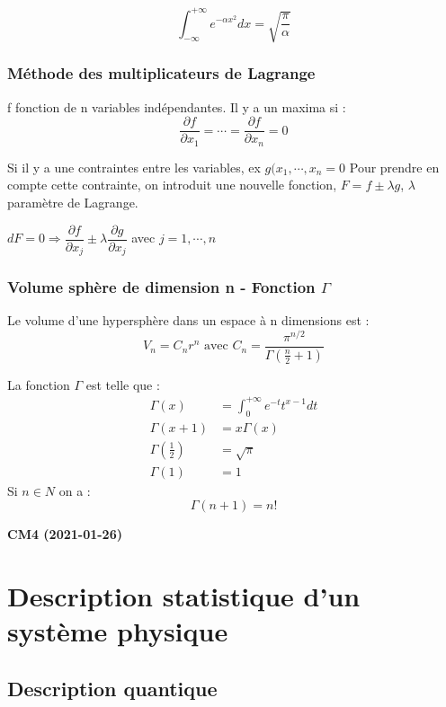 \documentclass[12pt,a4paper]{report}
\begin{document}
\[
	\int_{-\infty}^{+\infty} e^{-\alpha x^2}dx = \sqrt{\dfrac{\pi}{\alpha}}
\]

\subsection{Méthode des multiplicateurs de Lagrange}

f fonction de n variables indépendantes. Il y a un maxima si :
\[
	\dfrac{\partial f}{\partial x_1} = \cdots = \dfrac{\partial f}{\partial x_n} = 0
\]

Si il y a une contraintes entre les variables, ex \(g(x_1, \cdots, x_n = 0\)
Pour prendre en compte cette contrainte, on introduit une nouvelle fonction, \(F = f \pm \lambda g\), \(\lambda\) paramètre de Lagrange.

\(dF = 0 \Rightarrow \dfrac{\partial f}{\partial x_j} \pm \lambda \dfrac{\partial g}{\partial x_j}\) avec \(j = 1, \cdots, n\)

\subsection{Volume sphère de dimension n - Fonction \(\Gamma\)}

Le volume d'une hypersphère dans un espace à n dimensions est :
\[
	V_n = C_n r^n \text{ avec } C_n = \dfrac{\pi^{n/2}}{\Gamma\left( \frac{n}{2} + 1 \right)}
\]

La fonction \(\Gamma\) est telle que :
\begin{align*}
	\Gamma(x) &= \int_0^{+\infty} e^{-t} t^{x - 1} dt\\
	\Gamma (x+1) &= x \Gamma(x)\\
	\Gamma (\frac{1}{2}) &= \sqrt{\pi}\\
	\Gamma (1) &= 1	
\end{align*}
Si \(n \in N\) on a :
\[
\Gamma (n + 1) = n!
\]	

\begin{center}
\textbf{CM4 (2021-01-26)}
\end{center}

\chapter{Description statistique d'un système physique}

\section{Description quantique}
\end{document}
